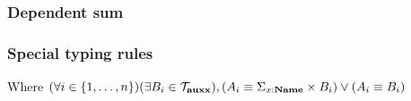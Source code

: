 \documentclass[a4paper]{article}
\begin{document}
\subsubsection{Dependent sum}

\begin{minipage}{0.8\textwidth}
  \begin{flushleft}
    \begin{prooftree}
    \end{prooftree}

    \begin{prooftree}
    \end{prooftree}
  \end{flushleft}
\end{minipage}
\begin{minipage}{0.2\textwidth}
  \begin{flushright}
    \begin{prooftree}
    \end{prooftree}

    \begin{prooftree}
    \end{prooftree}
  \end{flushright}
\end{minipage}

\subsubsection{Special typing rules}

\begin{prooftree}
\end{prooftree}

Where $(\forall i \in \{ 1, \dots, n \}) (\exists B_i \in \mathcal{T}_{\bf auxx}), (A_i \equiv \Sigma_{x : {\bf Name}} \times B_i) \vee (A_i \equiv B_i)$
\end{document}
